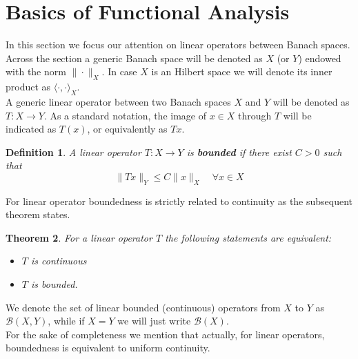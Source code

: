 \documentclass[corpo=11pt, stile=classica, tipotesi=custom,
greek, evenboxes, english]{toptesi}
\numberwithin{equation}{chapter}
\newtheorem{teo}{Theorem}[chapter] %
\newtheorem{defi}[teo]{Definition}
\newcommand{\B}{\mathcal{B}} %
\begin{document}
\section{Basics of Functional Analysis}\label{section basics of functional analysis}
In this section we focus our attention on linear operators between Banach spaces. Across the section a generic Banach space will be denoted as $X$ (or $Y$) endowed with the norm $\| \cdot \|_X$. In case $X$ is an Hilbert space we will denote its inner product as $\langle \cdot, \cdot \rangle_X$.\\
A generic linear operator between two Banach spaces $X$ and $Y$ will be denoted as $T : X \rightarrow Y$. As a standard notation, the image of $x \in X$ through $T$ will be indicated as $T(x)$, or equivalently as $Tx$.
\begin{defi}\label{bounded operator}
	A linear operator $T : X \rightarrow Y$ is \textbf{bounded} if there exist $C>0$ such that
	\begin{equation}\label{boundedness property}
		\| Tx \|_Y \leq C \| x \|_X \quad \forall x \in X
	\end{equation}
\end{defi}
For linear operator boundedness is strictly related to continuity as the subsequent theorem states.
\begin{teo}\label{equivalente boundedness continuity}
	For a linear operator $T$ the following statements are equivalent:
	\begin{itemize}
		\item $T$ is continuous
		\item $T$ is bounded.
	\end{itemize}
\end{teo}
We denote the set of linear bounded (continuous) operators from $X$ to $Y$ as $\B(X,Y)$, while if $X=Y$ we will just write $\B(X)$.\\
For the sake of completeness we mention that actually, for linear operators, boundedness is equivalent to uniform continuity.
\end{document}
